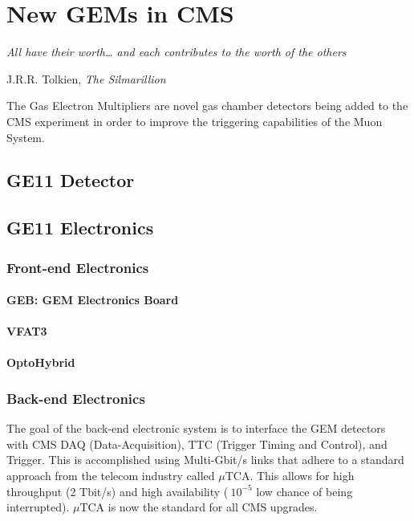 \chapter{New GEMs in CMS}
\epigraph{\itshape All have their worth… and each contributes to the worth of the others}{J.R.R. Tolkien, \textit{The Silmarillion} }

%
The Gas Electron Multipliers are novel gas chamber detectors being added to the CMS experiment in order to improve the triggering capabilities of the Muon System.


\section{GE11 Detector}
%

\section{GE11 Electronics}

\subsection{Front-end Electronics}
%

\subsubsection{GEB: GEM Electronics Board}
%

\subsubsection{VFAT3}
%

\subsubsection{OptoHybrid}
%

\subsection{Back-end Electronics}
%
The goal of the back-end electronic system is to interface the GEM detectors with CMS DAQ (Data-Acquisition), TTC (Trigger Timing and Control), and Trigger. This is accomplished using Multi-Gbit/s links that adhere to a standard approach from the telecom industry called $\mu$TCA. This allows for high throughput (2 Tbit/s) and high availability ($~10^{-5}$ low chance of being interrupted). $\mu$TCA is now the standard for all CMS upgrades.

